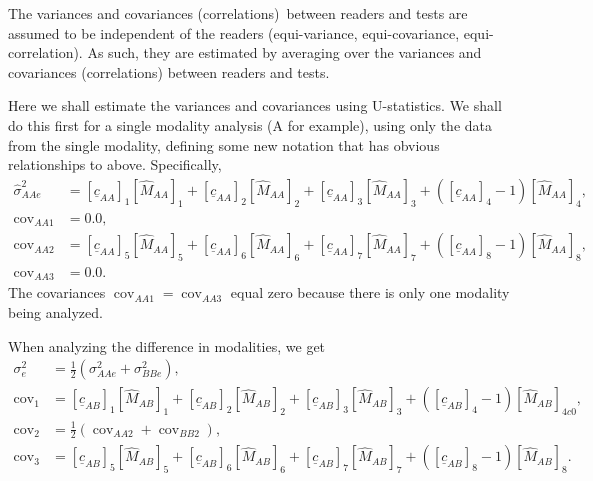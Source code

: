 \documentclass{article}%
\begin{document}
The variances and covariances (correlations)\ between readers and tests are
assumed to be independent of the readers (equi-variance, equi-covariance,
equi-correlation). As such, they are estimated by averaging over the variances
and covariances (correlations) between readers and tests.

Here we shall estimate the variances and covariances using U-statistics. We
shall do this first for a single modality analysis (A for example), using only
the data from the single modality, defining some new notation that has obvious
relationships to above. Specifically,%
\begin{align}
\widehat{\sigma}_{AAe}^{2}  &  =\left[  \underline{c}_{AA}\right]  _{1}\left[
\widehat{M}_{AA}\right]  _{1}+\left[  \underline{c}_{AA}\right]  _{2}\left[
\widehat{M}_{AA}\right]  _{2}+\left[  \underline{c}_{AA}\right]  _{3}\left[
\widehat{M}_{AA}\right]  _{3}+\left(  \left[  \underline{c}_{AA}\right]
_{4}-1\right)  \left[  \widehat{M}_{AA}\right]  _{4},\\
\operatorname{cov}_{AA1}  &  =0.0,\\
\operatorname{cov}_{AA2}  &  =\left[  \underline{c}_{AA}\right]  _{5}\left[
\widehat{M}_{AA}\right]  _{5}+\left[  \underline{c}_{AA}\right]  _{6}\left[
\widehat{M}_{AA}\right]  _{6}+\left[  \underline{c}_{AA}\right]  _{7}\left[
\widehat{M}_{AA}\right]  _{7}+\left(  \left[  \underline{c}_{AA}\right]
_{8}-1\right)  \left[  \widehat{M}_{AA}\right]  _{8},\\
\operatorname{cov}_{AA3}  &  =0.0.
\end{align}
The covariances $\operatorname{cov}_{AA1}=\operatorname{cov}_{AA3}$ equal zero
because there is only one modality being analyzed.

When analyzing the difference in modalities, we get%
\begin{align}
\sigma_{e}^{2}  &  =\frac{1}{2}\left(  \sigma_{AAe}^{2}+\sigma_{BBe}%
^{2}\right)  ,\\
\operatorname{cov}_{1}  &  =\left[  \underline{c}_{AB}\right]  _{1}\left[
\widehat{M}_{AB}\right]  _{1}+\left[  \underline{c}_{AB}\right]  _{2}\left[
\widehat{M}_{AB}\right]  _{2}+\left[  \underline{c}_{AB}\right]  _{3}\left[
\widehat{M}_{AB}\right]  _{3}+\left(  \left[  \underline{c}_{AB}\right]
_{4}-1\right)  \left[  \widehat{M}_{AB}\right]  _{4c0},\\
\operatorname{cov}_{2}  &  =\frac{1}{2}\left(  \operatorname{cov}%
_{AA2}+\operatorname{cov}_{BB2}\right)  ,\\
\operatorname{cov}_{3}  &  =\left[  \underline{c}_{AB}\right]  _{5}\left[
\widehat{M}_{AB}\right]  _{5}+\left[  \underline{c}_{AB}\right]  _{6}\left[
\widehat{M}_{AB}\right]  _{6}+\left[  \underline{c}_{AB}\right]  _{7}\left[
\widehat{M}_{AB}\right]  _{7}+\left(  \left[  \underline{c}_{AB}\right]
_{8}-1\right)  \left[  \widehat{M}_{AB}\right]  _{8}.
\end{align}
\end{document}

